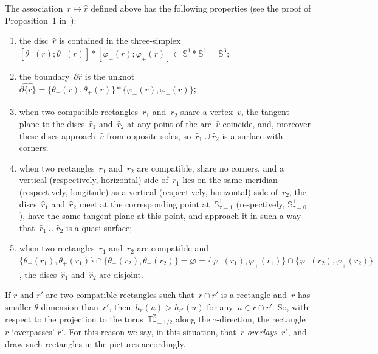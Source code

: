 \documentclass{amsart}
\theoremstyle{theorem}
\theoremstyle{remark}
\theoremstyle{definition}
\numberwithin{equation}{section}
\numberwithin{figure}{section}
\begin{document}
The association~$r\mapsto\widehat r$ defined above has the following properties (see the proof of Proposition~1
in~\cite{Representability}):
\begin{enumerate}
\item
the disc~$\widehat r$ is contained in the three-simplex~$[\theta_-(r);\theta_+(r)]*[\varphi_-(r);
\varphi_+(r)]\subset\mathbb S^1*\mathbb S^1=\mathbb S^3$;
\item
the boundary~$\partial\widehat r$ is the unknot~$\widehat{\partial\{r\}}=
\{\theta_-(r),\theta_+(r)\}*\{\varphi_-(r),\varphi_+(r)\}$;
\item
when two compatible rectangles~$r_1$ and~$r_2$ share a vertex~$v$, the tangent plane to the discs~$\widehat r_1$
and~$\widehat r_2$ at any point of the arc~$\widehat v$ coincide, and, moreover these
discs approach~$\widehat v$ from opposite sides, so~$\widehat r_1\cup\widehat r_2$ is a surface
with corners;
\item
when two rectangles~$r_1$ and~$r_2$ are compatible, share no corners, and a vertical (respectively, horizontal) side of~$r_1$
lies on the same meridian (respectively, longitude) as a vertical (respectively, horizontal) side of~$r_2$,
the discs~$\widehat r_1$ and~$\widehat r_2$ meet at the corresponding point at~$\mathbb S^1_{\tau=1}$
(respectively, $\mathbb S^1_{\tau=0}$), have the same tangent plane at
this point, and approach it in such a way that~$\widehat r_1\cup\widehat r_2$ is a quasi-surface;
\item
when two rectangles~$r_1$ and~$r_2$ are compatible and~$\{\theta_-(r_1),\theta_+(r_1)\}
\cap\{\theta_-(r_2),\theta_+(r_2)\}=\varnothing=
\{\varphi_-(r_1),\varphi_+(r_1)\}\cap\{\varphi_-(r_2),\varphi_+(r_2)\}$,
the discs~$\widehat r_1$ and~$\widehat r_2$ are disjoint.
\end{enumerate}
If $r$ and $r'$ are two compatible rectangles such that~$r\cap r'$ is a rectangle
and~$r$ has smaller $\theta$-dimension than~$r'$, then~$h_r(u)>h_{r'}(u)$
for any~$u\in r\cap r'$. So, with respect to the projection to the torus~$\mathbb T^2_{\tau=1/2}$
along the $\tau$-direction, the rectangle~$r$ `overpasses' $r'$.
For this reason we say, in this situation, that~$r$ \emph{overlays}~$r'$,
and draw such rectangles in the pictures accordingly.
\end{document}
